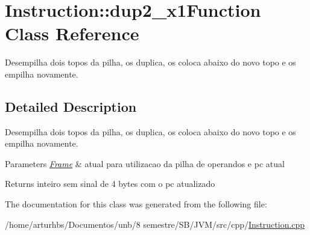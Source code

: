 \hypertarget{classInstruction_1_1dup2__x1Function}{}\section{Instruction\+:\+:dup2\+\_\+x1\+Function Class Reference}
\label{classInstruction_1_1dup2__x1Function}


Desempilha dois topos da pilha, os duplica, os coloca abaixo do novo topo e os empilha novamente.  




\subsection{Detailed Description}
Desempilha dois topos da pilha, os duplica, os coloca abaixo do novo topo e os empilha novamente. 


\begin{DoxyParams}{Parameters}
{\em \hyperlink{classFrame}{Frame}} & atual para utilizacao da pilha de operandos e pc atual \\
\hline
\end{DoxyParams}
\begin{DoxyReturn}{Returns}
inteiro sem sinal de 4 bytes com o pc atualizado 
\end{DoxyReturn}


The documentation for this class was generated from the following file\+:\begin{DoxyCompactItemize}
\item 
/home/arturhbs/\+Documentos/unb/8 semestre/\+S\+B/\+J\+V\+M/src/cpp/\hyperlink{Instruction_8cpp}{Instruction.\+cpp}\end{DoxyCompactItemize}
